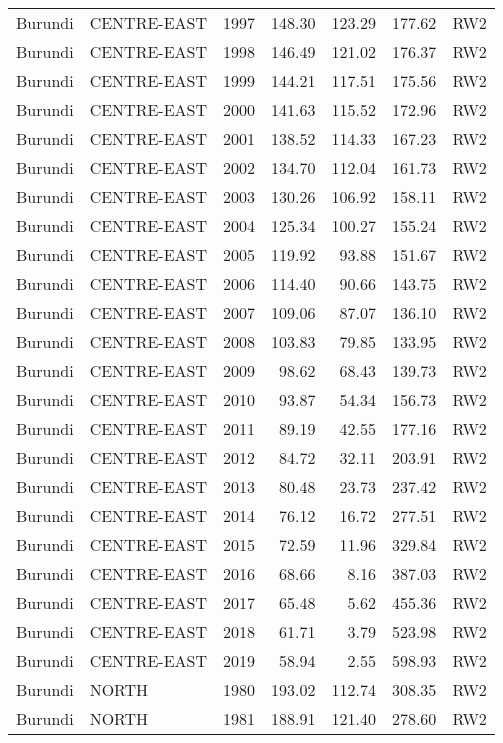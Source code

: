 \begin{longtable}{lllrrrl}
  Burundi & CENTRE-EAST & 1997 & 148.30 & 123.29 & 177.62 & RW2 \\ 
  Burundi & CENTRE-EAST & 1998 & 146.49 & 121.02 & 176.37 & RW2 \\ 
  Burundi & CENTRE-EAST & 1999 & 144.21 & 117.51 & 175.56 & RW2 \\ 
  Burundi & CENTRE-EAST & 2000 & 141.63 & 115.52 & 172.96 & RW2 \\ 
  Burundi & CENTRE-EAST & 2001 & 138.52 & 114.33 & 167.23 & RW2 \\ 
  Burundi & CENTRE-EAST & 2002 & 134.70 & 112.04 & 161.73 & RW2 \\ 
  Burundi & CENTRE-EAST & 2003 & 130.26 & 106.92 & 158.11 & RW2 \\ 
  Burundi & CENTRE-EAST & 2004 & 125.34 & 100.27 & 155.24 & RW2 \\ 
  Burundi & CENTRE-EAST & 2005 & 119.92 & 93.88 & 151.67 & RW2 \\ 
  Burundi & CENTRE-EAST & 2006 & 114.40 & 90.66 & 143.75 & RW2 \\ 
  Burundi & CENTRE-EAST & 2007 & 109.06 & 87.07 & 136.10 & RW2 \\ 
  Burundi & CENTRE-EAST & 2008 & 103.83 & 79.85 & 133.95 & RW2 \\ 
  Burundi & CENTRE-EAST & 2009 & 98.62 & 68.43 & 139.73 & RW2 \\ 
  Burundi & CENTRE-EAST & 2010 & 93.87 & 54.34 & 156.73 & RW2 \\ 
  Burundi & CENTRE-EAST & 2011 & 89.19 & 42.55 & 177.16 & RW2 \\ 
  Burundi & CENTRE-EAST & 2012 & 84.72 & 32.11 & 203.91 & RW2 \\ 
  Burundi & CENTRE-EAST & 2013 & 80.48 & 23.73 & 237.42 & RW2 \\ 
  Burundi & CENTRE-EAST & 2014 & 76.12 & 16.72 & 277.51 & RW2 \\ 
  Burundi & CENTRE-EAST & 2015 & 72.59 & 11.96 & 329.84 & RW2 \\ 
  Burundi & CENTRE-EAST & 2016 & 68.66 & 8.16 & 387.03 & RW2 \\ 
  Burundi & CENTRE-EAST & 2017 & 65.48 & 5.62 & 455.36 & RW2 \\ 
  Burundi & CENTRE-EAST & 2018 & 61.71 & 3.79 & 523.98 & RW2 \\ 
  Burundi & CENTRE-EAST & 2019 & 58.94 & 2.55 & 598.93 & RW2 \\ 
  Burundi & NORTH & 1980 & 193.02 & 112.74 & 308.35 & RW2 \\ 
  Burundi & NORTH & 1981 & 188.91 & 121.40 & 278.60 & RW2 \\ 

\end{longtable}
